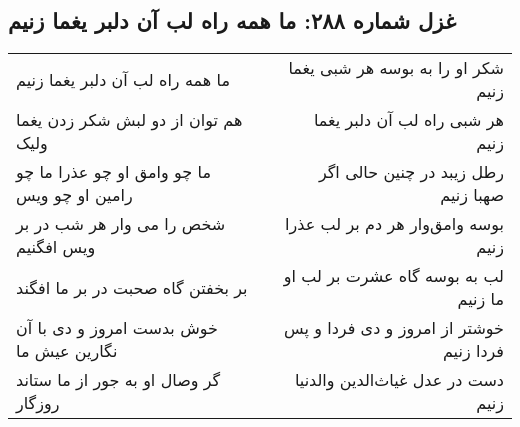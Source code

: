 \begin{center}
\section*{غزل شماره ۲۸۸: ما همه راه لب آن دلبر یغما زنیم}
\label{sec:288}
\begin{longtable}{l p{0.5cm} r}
ما همه راه لب آن دلبر یغما زنیم
&&
شکر او را به بوسه هر شبی یغما زنیم
\\
هم توان از دو لبش شکر زدن یغما ولیک
&&
هر شبی راه لب آن دلبر یغما زنیم
\\
ما چو وامق او چو عذرا ما چو رامین او چو ویس
&&
رطل زیبد در چنین حالی اگر صهبا زنیم
\\
شخص را می وار هر شب در بر ویس افگنیم
&&
بوسه وامق‌وار هر دم بر لب عذرا زنیم
\\
بر بخفتن گاه صحبت در بر ما افگند
&&
لب به بوسه گاه عشرت بر لب او ما زنیم
\\
خوش بدست امروز و دی با آن نگارین عیش ما
&&
خوشتر از امروز و دی فردا و پس فردا زنیم
\\
گر وصال او به جور از ما ستاند روزگار
&&
دست در عدل غیاث‌الدین والدنیا زنیم
\\
\end{longtable}
\end{center}
